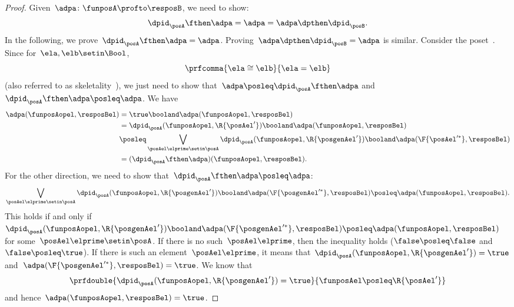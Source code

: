 \begin{proof}
    Given~$\adpa\colon \funposA\profto \resposB$, we need to show:
    \begin{equation}
        \dpid_\posA \fthen \adpa = \adpa = \adpa \dpthen \dpid_\posB.
    \end{equation}
    In the following, we prove~$\dpid_\posA \fthen \adpa = \adpa$.
    Proving~$\adpa\dpthen \dpid_\posB=\adpa$ is similar.
    Consider the poset~\Bool.
    Since for~$\ela,\elb\setin \Bool$,
    \begin{equation}
        \prfcomma{
            \ela\cong \elb
        }{
            \ela=\elb
        }
    \end{equation}
    (also referred to as skeletality~\cite{fong2019}), we just need to show that~$\adpa\posleq \dpid_\posA\fthen \adpa$ and~$\dpid_\posA\fthen \adpa\posleq \adpa$.
    We have
    \begin{equation}
        \label{eq:dp_unit_1}
        \begin{aligned}
            \adpa(\funposAopel,\resposBel) & =\true \booland \adpa(\funposAopel,\resposBel) \\
                                           & = \dpid_\posA(\funposAopel,\R{\posAel'}) \booland \adpa(\funposAopel,\resposBel) \\
                                           & \posleq \bigvee_{\posAel\elprime \setin \posA}\dpid_\posA(\funposAopel,\R{\posgenAel'})\booland \adpa(\F{\posAel'^*},\resposBel) \\
                                           & =(\dpid_\posA\fthen \adpa)(\funposAopel,\resposBel).
        \end{aligned}
    \end{equation}
    For the other direction, we need to show that~$\dpid_\posA\fthen \adpa\posleq \adpa$:
    \begin{equation}
        \label{eq:dp_unit_2}
        \bigvee_{\posAel\elprime\setin \posA}\dpid_\posA(\funposAopel,\R{\posgenAel'})\booland \adpa(\F{\posgenAel'^*},\resposBel) \posleq \adpa(\funposAopel,\resposBel).
    \end{equation}
    This holds if and only if~$\dpid_\posA(\funposAopel,\R{\posgenAel'})\booland \adpa(\F{\posgenAel'^*},\resposBel) \posleq \adpa(\funposAopel,\resposBel)$ for some~$\posAel\elprime\setin \posA$.
    If there is no such~$\posAel\elprime$, then the inequality holds ($\false \posleq \false$ and~$\false \posleq \true$).
    If there is such an element~$\posAel\elprime$, it means that~$\dpid_\posA(\funposAopel,\R{\posgenAel'})=\true$ and~$\adpa(\F{\posgenAel'^*},\resposBel)=\true$.
    We know that
    \begin{equation}
        \prfdouble{
            \dpid_\posA(\funposAopel,\R{\posgenAel'})=\true
        }{
            \funposAel \posleq \R{\posAel'}
        }
    \end{equation}
    and hence~$\adpa(\funposAopel,\resposBel)=\true$.
\end{proof}
